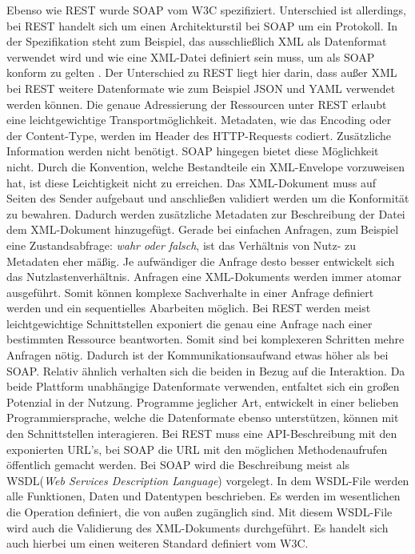 \documentclass[fleqn,10.5pt,ngerman]{SelfArx}
\begin{document}
Ebenso wie REST wurde SOAP vom W3C spezifiziert. Unterschied ist allerdings, bei REST handelt sich um einen Architekturstil bei SOAP um ein Protokoll. In der Spezifikation steht zum Beispiel, das ausschließlich XML als Datenformat verwendet wird und wie eine XML-Datei definiert sein muss, um als SOAP konform zu gelten \cite{w3cSOAP}. Der Unterschied zu REST liegt hier darin, dass außer XML bei REST weitere Datenformate wie zum Beispiel JSON und YAML verwendet werden können. Die genaue Adressierung der Ressourcen unter REST erlaubt eine leichtgewichtige Transportmöglichkeit. Metadaten, wie das Encoding oder der Content-Type, werden im Header des HTTP-Requests codiert. Zusätzliche Information werden nicht benötigt. SOAP hingegen bietet diese Möglichkeit nicht. Durch die Konvention, welche Bestandteile ein XML-Envelope vorzuweisen hat, ist diese Leichtigkeit nicht zu erreichen. Das XML-Dokument muss auf Seiten des Sender aufgebaut und anschließen validiert werden um die Konformität zu bewahren. Dadurch werden zusätzliche Metadaten zur Beschreibung der Datei dem XML-Dokument hinzugefügt. Gerade bei einfachen Anfragen, zum Beispiel eine Zustandsabfrage: \textit{wahr oder falsch}, ist das Verhältnis von Nutz- zu Metadaten eher mäßig. Je aufwändiger die Anfrage desto besser entwickelt sich das Nutzlastenverhältnis. Anfragen eine XML-Dokuments werden immer atomar ausgeführt. Somit können komplexe Sachverhalte in einer Anfrage definiert werden und ein sequentielles Abarbeiten möglich. Bei REST werden meist leichtgewichtige Schnittstellen exponiert die genau eine Anfrage nach einer bestimmten Ressource beantworten. Somit sind bei komplexeren Schritten mehre Anfragen nötig. Dadurch ist der Kommunikationsaufwand etwas höher als bei SOAP. Relativ ähnlich verhalten sich die beiden in Bezug auf die Interaktion. Da beide Plattform unabhängige Datenformate verwenden, entfaltet sich ein großen Potenzial in der Nutzung. Programme jeglicher Art, entwickelt in einer belieben Programmiersprache, welche die Datenformate ebenso unterstützen, können mit den Schnittstellen interagieren. Bei REST muss eine API-Beschreibung mit den exponierten URL's, bei SOAP die URL mit den möglichen Methodenaufrufen öffentlich gemacht werden. Bei SOAP wird die Beschreibung meist als WSDL(\textit{Web Services Description Language}) \cite{w3cWSDL} vorgelegt. In dem WSDL-File werden alle Funktionen, Daten und Datentypen beschrieben. Es werden im wesentlichen die Operation definiert, die von außen zugänglich sind. Mit diesem WSDL-File wird auch die Validierung des XML-Dokuments durchgeführt. Es handelt sich auch hierbei um einen weiteren Standard definiert vom W3C.
\end{document}
